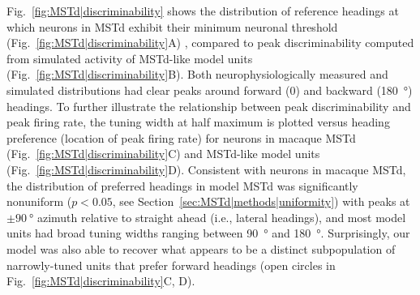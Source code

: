 
Fig.~\ref{fig:MSTd|discriminability} shows the distribution of reference 
headings at which neurons in \ac{MSTd} exhibit their minimum neuronal 
threshold (Fig.~\ref{fig:MSTd|discriminability}A) \citep{Gu2010},
compared to peak discriminability computed from simulated activity of 
\ac{MSTd}-like model units (Fig.~\ref{fig:MSTd|discriminability}B). 
Both neurophysiologically measured and simulated distributions had clear 
peaks around forward ($0$) and backward (\SI{180}{\degree}) headings. 
To further illustrate the relationship between peak discriminability and 
peak firing rate, the tuning width at half maximum is plotted versus heading
preference (location of peak firing rate) for neurons in macaque \ac{MSTd}
(Fig.~\ref{fig:MSTd|discriminability}C) and \ac{MSTd}-like model units 
(Fig.~\ref{fig:MSTd|discriminability}D). Consistent with neurons in 
macaque \ac{MSTd}, the distribution of preferred headings in model \ac{MSTd}
was significantly nonuniform ($p<0.05$, see
Section~\ref{sec:MSTd|methods|uniformity}) with peaks at $\pm \SI{90}{\degree}$
azimuth relative to straight ahead (i.e., lateral headings), and most model 
units had broad tuning widths ranging between \SI{90}{\degree} and
\SI{180}{\degree}. Surprisingly, our model was also able to recover what
appears to be a distinct subpopulation of narrowly-tuned units that 
prefer forward headings (open circles in 
Fig.~\ref{fig:MSTd|discriminability}C, D).

